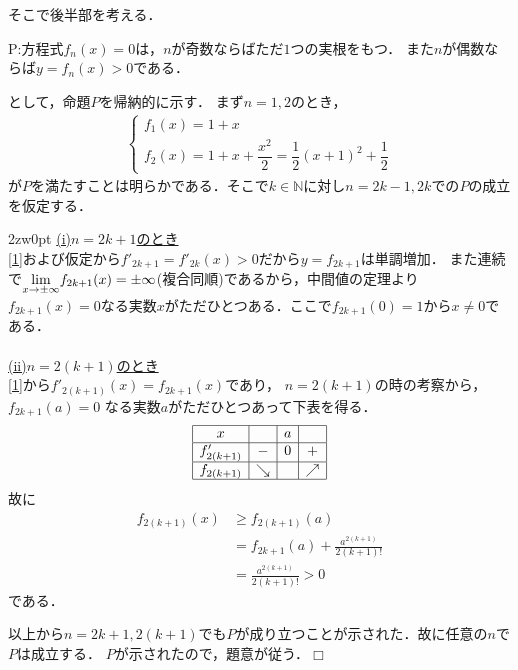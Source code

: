 \documentclass[a4j]{jarticle}
\begin{document}
\begin{multicols}{2}
そこで後半部を考える．
\begin{center}
P:方程式$f_n(x)=0$は，$n$が奇数ならばただ$1$つの実根をもつ．
また$n$が偶数ならば$y=f_n(x)>0$である．
\end{center}
として，命題$P$を帰納的に示す．
まず$n=1,2$のとき，
     \begin{align*}
     \left\{
          \begin{array}{l}
          f_1(x)=1+x \\
          f_2(x)=1+x+\dfrac{x^2}{2}=\dfrac{1}{2}(x+1)^2+\dfrac{1}{2}
          \end{array}
     \right.     
     \end{align*}
が$P$を満たすことは明らかである．そこで$k\in\mathbb{N}$に対し$n=2k-1,2k$での$P$の成立を仮定する．
     \begin{indentation}{2zw}{0pt}
      \noindent\underline{(i)$n=2k+1$のとき} \\
      \eqref{1}および仮定から$f'_{2k+1}=f'_{2k}(x)>0$だから$y=f_{2k+1}$は単調増加．
     また連続で${\displaystyle \lim_{x\to\pm\infty}}f_{2k+1}(x)=\pm\infty$(複合同順)であるから，中間値の定理より
     $f_{2k+1}(x)=0$なる実数$x$がただひとつある．ここで$f_{2k+1}(0)=1$から$x\not=0$である． \\
     \\
     \underline{(ii)$n=2(k+1)$のとき} \noindent \\
     \eqref{1}から$f'_{2(k+1)}(x)=f_{2k+1}(x)$であり，  $n=2(k+1)$の時の考察から，$f_{2k+1}(a)=0$
     なる実数$a$がただひとつあって下表を得る．
          \begin{align*}
               \begin{array}{|c|c|c|c|} \hline
               x                  &      & a &    \\ \hline
               f'_{2(k+1)}   &  -   & 0 & +   \\ \hline
                f_{2(k+1)}   & \searrow&    & \nearrow  \\ \hline
                \end{array}
           \end{align*}
      故に
      \begin{align*}
      f_{2(k+1)}(x)&\ge f_{2(k+1)}(a) \\ 
      &= f_{2k+1}(a)+\frac{a^{2(k+1)}}{2(k+1)!}   \\
      &=\frac{a^{2(k+1)}}{2(k+1)!}  
      >0 
      \end{align*}
     である．
     \end{indentation}
  
  以上から$n=2k+1,2(k+1)$でも$P$が成り立つことが示された．故に任意の$n$で$P$は成立する．
$P$が示されたので，題意が従う．$\Box$
 
\newpage
\end{multicols}
\end{document}
